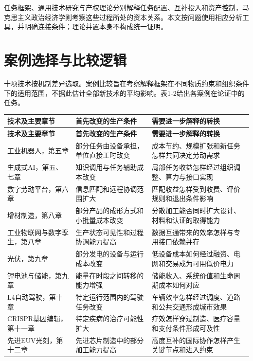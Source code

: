 \documentclass[UTF8,fontset=windows,12pt,a4paper,oneside,openany]{ctexbook}
\begin{document}
任务框架、通用技术研究与产权理论分别解释任务配置、互补投入和资产控制，马克思主义政治经济学则考察这些过程所处的资本关系。本文按问题使用相应分析工具，并明确连接条件；理论并置本身不构成统一证明。

\section{案例选择与比较逻辑}

十项技术按机制差异选取。案例比较旨在考察解释框架在不同物质约束和组织条件下的适用范围，不据此估计全部新技术的平均影响。表1-2给出各案例在论证中的任务。

\begingroup\footnotesize\setlength{\tabcolsep}{4pt}\renewcommand{\arraystretch}{1.25}
\begin{longtable}{>{\raggedright\arraybackslash}p{}>{\raggedright\arraybackslash}p{}>{\raggedright\arraybackslash}p{}}
\toprule
\textbf{技术及主要章节} & \textbf{首先改变的生产条件} & \textbf{需要进一步解释的转换} \\
\midrule\endfirsthead
\toprule
\textbf{技术及主要章节} & \textbf{首先改变的生产条件} & \textbf{需要进一步解释的转换} \\
\midrule\endhead
\bottomrule\endfoot
工业机器人，第五章 & 部分任务由设备承担，单位直接工时改变 & 成本节约、规模扩张和新任务怎样共同决定劳动需求 \\
生成式AI，第五、七章 & 知识调用与任务辅助成本改变 & 局部任务收益怎样经过组织调整、算力与接口实现 \\
数字劳动平台，第六章 & 信息匹配和远程协调范围扩大 & 匹配收益怎样受到收费、评价规则和退出条件影响 \\
增材制造，第八章 & 部分产品的成形方式和小批量成本改变 & 分散加工能否同时扩大设计、材料和认证的取得能力 \\
工业物联网与数字孪生，第八章 & 生产状态可见性和过程协调能力提高 & 数据互通带来的效率怎样与专用接口依赖并存 \\
光伏，第九章 & 部分发电的设备与运行成本改变 & 低设备成本如何经过融资、电网和交易成为可用低价电力 \\
锂电池与储能，第九章 & 能量在时段之间转移的能力增强 & 储能收入、系统价值和生命周期成本如何对应 \\
L4自动驾驶，第十章 & 特定运行范围内的驾驶任务改变 & 车辆效率怎样经过调度、道路和公共交通形成城市效果 \\
CRISPR基因编辑，第十一章 & 特定疾病的治疗可能性扩大 & 疗效怎样穿过制造、医疗容量和支付条件形成可及性 \\
先进EUV光刻，第十二章 & 先进芯片制造中的部分加工能力提高 & 高度互补的国际协作怎样产生关键节点和进入约束 \\
\end{longtable}\endgroup
\end{document}
